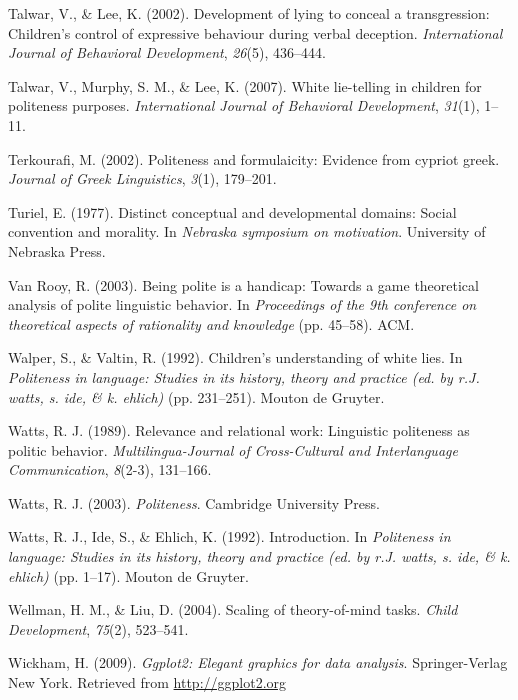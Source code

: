 \documentclass[oneside]{report}
\begin{document}
\hypertarget{ref-talwar2002}{}
Talwar, V., \& Lee, K. (2002). Development of lying to conceal a
transgression: Children's control of expressive behaviour during verbal
deception. \emph{International Journal of Behavioral Development},
\emph{26}(5), 436--444.

\hypertarget{ref-talwar2007}{}
Talwar, V., Murphy, S. M., \& Lee, K. (2007). White lie-telling in
children for politeness purposes. \emph{International Journal of
Behavioral Development}, \emph{31}(1), 1--11.

\hypertarget{ref-terkourafi2002}{}
Terkourafi, M. (2002). Politeness and formulaicity: Evidence from
cypriot greek. \emph{Journal of Greek Linguistics}, \emph{3}(1),
179--201.

\hypertarget{ref-turiel1977}{}
Turiel, E. (1977). Distinct conceptual and developmental domains: Social
convention and morality. In \emph{Nebraska symposium on motivation}.
University of Nebraska Press.

\hypertarget{ref-vanRooy2003}{}
Van Rooy, R. (2003). Being polite is a handicap: Towards a game
theoretical analysis of polite linguistic behavior. In \emph{Proceedings
of the 9th conference on theoretical aspects of rationality and
knowledge} (pp. 45--58). ACM.

\hypertarget{ref-walper1992}{}
Walper, S., \& Valtin, R. (1992). Children's understanding of white
lies. In \emph{Politeness in language: Studies in its history, theory
and practice (ed. by r.J. watts, s. ide, \& k. ehlich)} (pp. 231--251).
Mouton de Gruyter.

\hypertarget{ref-watts1989}{}
Watts, R. J. (1989). Relevance and relational work: Linguistic
politeness as politic behavior. \emph{Multilingua-Journal of
Cross-Cultural and Interlanguage Communication}, \emph{8}(2-3),
131--166.

\hypertarget{ref-watts2003}{}
Watts, R. J. (2003). \emph{Politeness}. Cambridge University Press.

\hypertarget{ref-watts1992}{}
Watts, R. J., Ide, S., \& Ehlich, K. (1992). Introduction. In
\emph{Politeness in language: Studies in its history, theory and
practice (ed. by r.J. watts, s. ide, \& k. ehlich)} (pp. 1--17). Mouton
de Gruyter.

\hypertarget{ref-wellman2004}{}
Wellman, H. M., \& Liu, D. (2004). Scaling of theory-of-mind tasks.
\emph{Child Development}, \emph{75}(2), 523--541.

\hypertarget{ref-R-ggplot2}{}
Wickham, H. (2009). \emph{Ggplot2: Elegant graphics for data analysis}.
Springer-Verlag New York. Retrieved from \url{http://ggplot2.org}
\end{document}

